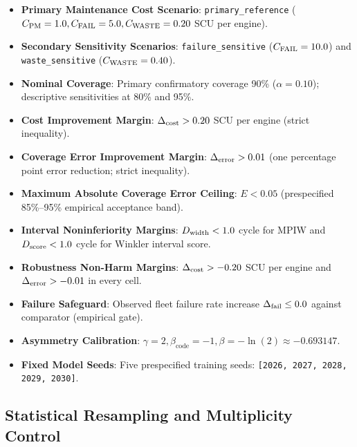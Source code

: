 \begin{itemize}
  \item \textbf{Primary Maintenance Cost Scenario}: \texttt{primary\_reference} ($C_{\text{PM}} = 1.0, C_{\text{FAIL}} = 5.0, C_{\text{WASTE}} = 0.20$ SCU per engine).
  \item \textbf{Secondary Sensitivity Scenarios}: \texttt{failure\_sensitive} ($C_{\text{FAIL}} = 10.0$) and \texttt{waste\_sensitive} ($C_{\text{WASTE}} = 0.40$).
  \item \textbf{Nominal Coverage}: Primary confirmatory coverage 90\% ($\alpha = 0.10$); descriptive sensitivities at 80\% and 95\%.
  \item \textbf{Cost Improvement Margin}: $\Delta_{\text{cost}} > 0.20$ SCU per engine (strict inequality).
  \item \textbf{Coverage Error Improvement Margin}: $\Delta_{\text{error}} > 0.01$ (one percentage point error reduction; strict inequality).
  \item \textbf{Maximum Absolute Coverage Error Ceiling}: $E < 0.05$ (prespecified 85\%--95\% empirical acceptance band).
  \item \textbf{Interval Noninferiority Margins}: $D_{\text{width}} < 1.0$ cycle for MPIW and $D_{\text{score}} < 1.0$ cycle for Winkler interval score.
  \item \textbf{Robustness Non-Harm Margins}: $\Delta_{\text{cost}} > -0.20$ SCU per engine and $\Delta_{\text{error}} > -0.01$ in every cell.
  \item \textbf{Failure Safeguard}: Observed fleet failure rate increase $\Delta_{\text{fail}} \le 0.0$ against comparator (empirical gate).
  \item \textbf{Asymmetry Calibration}: $\gamma = 2, \beta_{\text{code}} = -1, \beta = -\ln(2) \approx -0.693147$.
  \item \textbf{Fixed Model Seeds}: Five prespecified training seeds: \texttt{[2026, 2027, 2028, 2029, 2030]}.
\end{itemize}

\subsection*{Statistical Resampling and Multiplicity Control}

